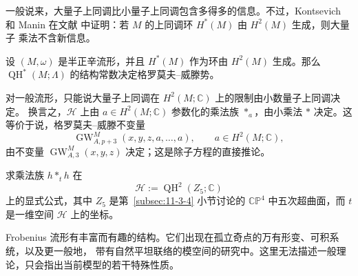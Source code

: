 一般说来，大量子上同调比小量子上同调包含多得多的信息。不过，Kontsevich 和 Manin
在文献  中证明：若 $M$ 的上同调环 $H^*(M)$ 由 $H^2(M)$ 生成，则大量子
乘法不含新信息。

\begin{theorem}\label{thm:11-5-8}
设 $(M,\omega)$ 是半正辛流形，并且 $H^*(M)$ 作为环由 $H^2(M)$ 生成。那么
$\operatorname{QH}^*(M;\Lambda)$ 的结构常数决定格罗莫夫--威滕势。
\end{theorem}

对一般流形，只能说大量子上同调在 $H^2(M;\mathbb C)$ 上的限制由小数量子上同调决定。
换言之，$\mathcal H$ 上由 $a\in H^2(M;\mathbb C)$ 参数化的乘法族 $*_a$，由小乘法 $*$
决定。这等价于说，格罗莫夫--威滕不变量
\[
  \operatorname{GW}^M_{A,p+3}(x,y,z,a,\ldots,a),
  \qquad a\in H^2(M;\mathbb C),
\]
由不变量 $\operatorname{GW}^M_{A,3}(x,y,z)$ 决定；这是除子方程的直接推论。

\begin{exercise}\label{ex:11-5-9}
求乘法族 $h*_t h$ 在
\[
  \mathcal H:=\operatorname{QH}^2(Z_5;\mathbb C)
\]
上的显式公式，其中 $Z_5$ 是第~\ref{subsec:11-3-4} 小节讨论的
$\mathbb{CP}^4$ 中五次超曲面，而 $t$ 是一维空间 $\mathcal H$ 上的坐标。
\end{exercise}

Frobenius 流形有丰富而有趣的结构。它们出现在孤立奇点的万有形变、可积系统，以及更一般地，
带有自然平坦联络的模空间的研究中。这里无法描述一般理论，只会指出当前模型的若干特殊性质。

